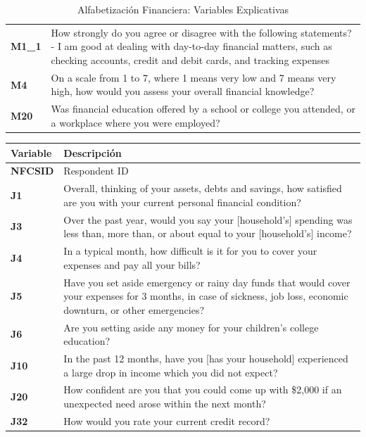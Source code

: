\documentclass[a4paper, 11pt]{article}
\begin{document}
\begin{table}
\begin{tabular}{>{\RaggedRight\hspace{0pt}}m{2cm} >{\RaggedRight\hspace{0pt}}m{11cm}}
\textbf{M1\_1} & How strongly do you agree or disagree with the following statements? - I am good at dealing with day-to-day financial matters, such as checking accounts, credit and debit cards, and tracking expenses \\
\textbf{M4} & On a scale from 1 to 7, where 1 means very low and 7 means very high, how would you assess your overall financial knowledge? \\
\textbf{M20} & Was financial education offered by a school or college you attended, or a workplace where you were employed?\\
\bottomrule
\end{tabular}
\caption{Alfabetización Financiera: Variables Explicativas}
\end{table}

\begin{table}
\centering
\footnotesize
\begin{tabular}{>{\RaggedRight\hspace{0pt}}m{2cm} >{\RaggedRight\hspace{0pt}}m{11cm}}
\toprule
\textbf{Variable} & \textbf{Descripción}\\
\midrule
\textbf{NFCSID} & Respondent ID \\
\textbf{J1} & Overall, thinking of your assets, debts and savings, how satisfied are you with your current personal financial condition?  \\
\textbf{J3} & Over the past year, would you say your [household's] spending was less than, more than, or about equal to your [household's] income?  \\
\textbf{J4} & In a typical month, how difficult is it for you to cover your expenses and pay all your bills?  \\
\textbf{J5} & Have you set aside emergency or rainy day funds that would cover your expenses for 3 months, in case of sickness, job loss, economic downturn, or other emergencies?  \\
\textbf{J6} & Are you setting aside any money for your children's college education?\\
\textbf{J10} & In the past 12 months, have you [has your household] experienced a large drop in income which you did not expect? \\
\textbf{J20} & How confident are you that you could come up with \$2,000 if an unexpected need arose within the next month?  \\
\textbf{J32} & How would you rate your current credit record? \\

\end{tabular}
\end{table}
\end{document}
